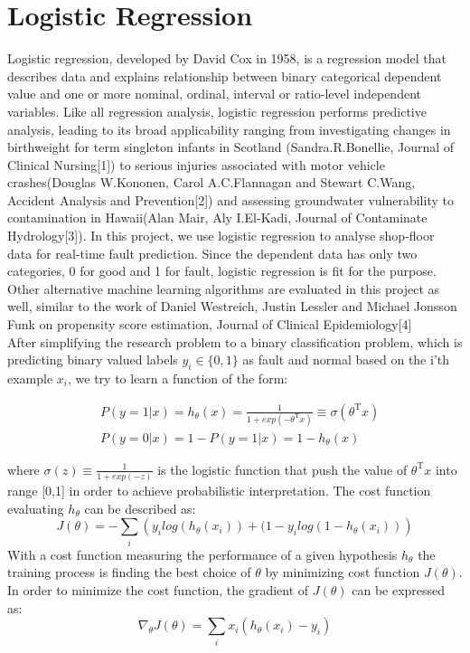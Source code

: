 \documentclass{kththesis}
\begin{document}
\section{Logistic Regression}
Logistic regression, developed by David Cox in 1958, is a regression model that describes data and explains relationship between binary categorical dependent value and one or more nominal, ordinal, interval or ratio-level independent variables. Like all regression analysis, logistic regression performs predictive analysis, leading to its broad applicability ranging from investigating changes in birthweight for term singleton infants in Scotland (Sandra.R.Bonellie, Journal of Clinical Nursing[1]) to serious injuries associated with motor vehicle crashes(Douglas W.Kononen, Carol A.C.Flannagan and Stewart C.Wang, Accident Analysis and Prevention[2]) and assessing groundwater vulnerability to contamination in Hawaii(Alan Mair, Aly I.El-Kadi, Journal of Contaminate Hydrology[3]). In this project, we use logistic regression to analyse shop-floor data for real-time fault prediction. Since the dependent data has only two categories, 0 for good and 1 for fault, logistic regression is fit for the purpose. Other alternative machine learning algorithms are evaluated in this project as well, similar to the work of Daniel Westreich, Justin Lessler and Michael Jonsson Funk on propensity score estimation, Journal of Clinical Epidemiology[4]\\

After simplifying the research problem to a binary classification problem, which is predicting binary valued labels $y_{i}\in \{0,1\}$ as fault and normal based on the i'th example $x_{i}$, we try to learn a function of the form:

\begin{align}
&P(y=1|x) = h_{\theta}(x)=\frac{1}{1+exp(-\theta^\mathrm{T}x)}\equiv\sigma(\theta^\mathrm{T}x)\\
&P(y=0|x) = 1-P(y=1|x)=1-h_{\theta}(x)
\end{align}

where $\sigma(z)\equiv\frac{1}{1+exp(-z)}$ is the logistic function that push the value of $\theta^\mathrm{T}x$ into range [0,1] in order to achieve probabilistic interpretation. The cost function evaluating $h_{\theta}$ can be described as:
\begin{equation}
J(\theta)=-\sum_{i}\left(y_{i}log(h_{\theta}(x_{i}))+(1-y_{i}log(1-h_{\theta}(x_{i}))\right)
\end{equation}
With a cost function measuring the performance of a given hypothesis $h_{\theta}$ the training process is finding the best choice of $\theta$ by minimizing cost function $J(\theta)$. In order to minimize the cost function, the gradient of $J(\theta)$ can be expressed as:
\begin{equation}
\nabla_{\theta}J(\theta)=\sum_{i}x_{i}(h_{\theta}(x_{i})-y_{i})
\end{equation}
\end{document}
